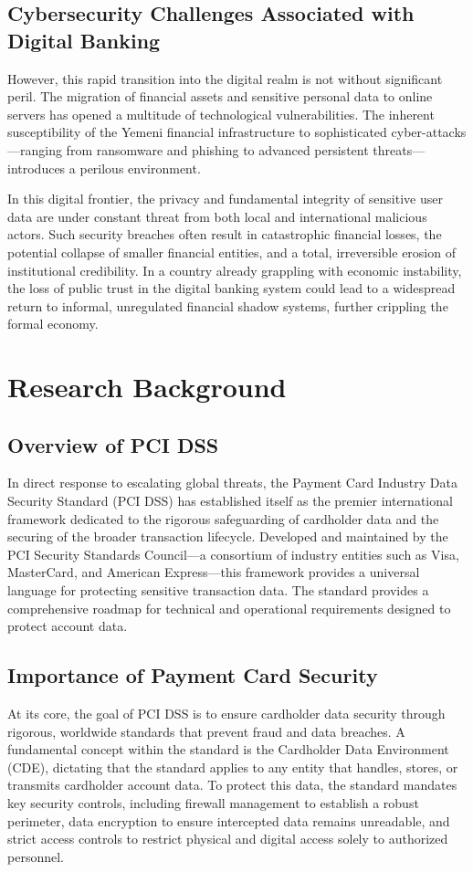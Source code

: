 \documentclass[12pt,a4paper,oneside]{report}
\begin{document}
	\subsection{Cybersecurity Challenges Associated with Digital Banking}
	However, this rapid transition into the digital realm is not without significant peril. The migration of financial assets and sensitive personal data to online servers has opened a multitude of technological vulnerabilities. The inherent susceptibility of the Yemeni financial infrastructure to sophisticated cyber-attacks—ranging from ransomware and phishing to advanced persistent threats—introduces a perilous environment. 
	
	In this digital frontier, the privacy and fundamental integrity of sensitive user data are under constant threat from both local and international malicious actors. Such security breaches often result in catastrophic financial losses, the potential collapse of smaller financial entities, and a total, irreversible erosion of institutional credibility. In a country already grappling with economic instability, the loss of public trust in the digital banking system could lead to a widespread return to informal, unregulated financial shadow systems, further crippling the formal economy.
	
	\section{Research Background}
	
	\subsection{Overview of PCI DSS}
	In direct response to escalating global threats, the Payment Card Industry Data Security Standard (PCI DSS) has established itself as the premier international framework dedicated to the rigorous safeguarding of cardholder data and the securing of the broader transaction lifecycle. Developed and maintained by the PCI Security Standards Council—a consortium of industry entities such as Visa, MasterCard, and American Express—this framework provides a universal language for protecting sensitive transaction data. The standard provides a comprehensive roadmap for technical and operational requirements designed to protect account data.
	
	\subsection{Importance of Payment Card Security}
	At its core, the goal of PCI DSS is to ensure cardholder data security through rigorous, worldwide standards that prevent fraud and data breaches. A fundamental concept within the standard is the Cardholder Data Environment (CDE), dictating that the standard applies to any entity that handles, stores, or transmits cardholder account data. To protect this data, the standard mandates key security controls, including firewall management to establish a robust perimeter, data encryption to ensure intercepted data remains unreadable, and strict access controls to restrict physical and digital access solely to authorized personnel.
	
\end{document}
